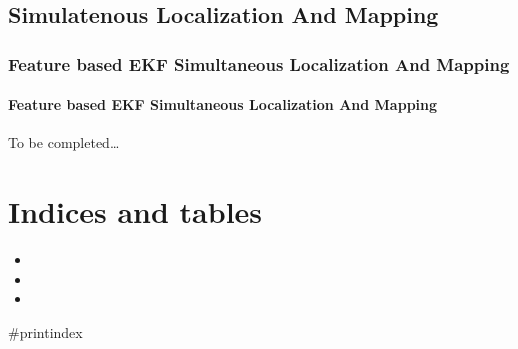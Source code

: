 \documentclass[letterpaper,10pt,english]{sphinxmanual}
\begin{document}
\section{Simulatenous Localization And Mapping}
\label{\detokenize{Localization_index:simulatenous-localization-and-mapping}}

\subsection{Feature based EKF Simultaneous Localization And Mapping}
\label{\detokenize{Localization_index:feature-based-ekf-simultaneous-localization-and-mapping}}
\sphinxstepscope


\subsubsection{Feature based EKF Simultaneous Localization And Mapping}
\label{\detokenize{FEKFSLAM:feature-based-ekf-simultaneous-localization-and-mapping}}\label{\detokenize{FEKFSLAM::doc}}
\sphinxAtStartPar
To be completed…


\begin{savenotes}\sphinxattablestart
\sphinxthistablewithglobalstyle
\sphinxthistablewithnovlinesstyle
\centering
\begin{tabulary}{\linewidth}[t]{}
\sphinxtoprule
\sphinxtableatstartofbodyhook\sphinxbottomrule
\end{tabulary}
\sphinxtableafterendhook\par
\sphinxattableend\end{savenotes}


\chapter{Indices and tables}
\label{\detokenize{index:indices-and-tables}}\begin{itemize}
\item {} 
\sphinxAtStartPar
{}

\item {} 
\sphinxAtStartPar
{}

\item {} 
\sphinxAtStartPar
{}

\end{itemize}



\renewcommand{\indexname}{Index}
\#printindex
\end{document}
